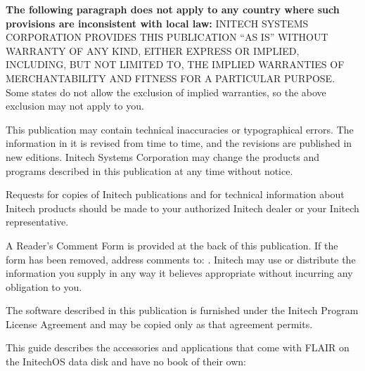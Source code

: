 \begin{TitleVerso}
\IsThisGoodForTheCompany
{\imLegalFont
\textbf{The following paragraph does not apply to any country where such
provisions are inconsistent with local law:} INITECH SYSTEMS CORPORATION
PROVIDES THIS PUBLICATION ``AS IS'' WITHOUT WARRANTY OF ANY KIND, EITHER
EXPRESS OR IMPLIED, INCLUDING, BUT NOT LIMITED TO, THE IMPLIED WARRANTIES OF
MERCHANTABILITY AND FITNESS FOR A PARTICULAR PURPOSE.  Some states do not
allow the exclusion of implied warranties, so the above exclusion may not
apply to you.\par
This publication may contain technical inaccuracies or typographical errors.
The information in it is revised from time to time, and the revisions are
published in new editions.  Initech Systems Corporation may change the
products and programs described in this publication at any time without
notice.\par
Requests for copies of Initech publications and for technical information
about Initech products should be made to your authorized Initech dealer or
your Initech representative.\par}

{\footnotesize
A Reader's Comment Form is provided at the back of this publication.  If the
form has been removed, address comments to: \InitechAddressLine.
Initech may use or distribute the information you supply in any way it
believes appropriate without incurring any obligation to you.\par
The software described in this publication is furnished under the Initech
Program License Agreement and may be copied only as that agreement
permits.\par}
\end{TitleVerso}

This guide describes the accessories and applications that come with
FLAIR\tm{} on the InitechOS\tm{} data disk and have no book of their own:

